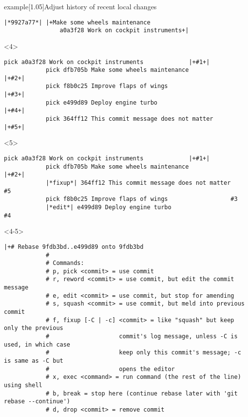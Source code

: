 \documentclass[usenames,svgnames,14pt]{beamer}
\begin{document}
\begin{frame}[c,fragile]
\begin{varblock}{example}[1.05\textwidth]{Adjust history of recent local changes}
\begin{uncoverenv}
\begin{lstlisting}[style=MyBash, aboveskip=-4pt]
                |*9927a77*| |+Make some wheels maintenance
                a0a3f28 Work on cockpit instruments+|
            \end{lstlisting}
        \end{uncoverenv}
    \end{varblock}
    \begin{onlyenv}<4>
        \begin{lstlisting}[style=MyBash]
            pick a0a3f28 Work on cockpit instruments             |+#1+|
            pick dfb705b Make some wheels maintenance            |+#2+|
            pick f8b0c25 Improve flaps of wings                  |+#3+|
            pick e499d89 Deploy engine turbo                     |+#4+|
            pick 364ff12 This commit message does not matter     |+#5+|
        \end{lstlisting}
    \end{onlyenv}
    \begin{onlyenv}<5>
        \begin{lstlisting}[style=MyBash]
            pick a0a3f28 Work on cockpit instruments             |+#1+|
            pick dfb705b Make some wheels maintenance            |+#2+|
            |*fixup*| 364ff12 This commit message does not matter    #5
            pick f8b0c25 Improve flaps of wings                  #3
            |*edit*| e499d89 Deploy engine turbo                     #4
        \end{lstlisting}
    \end{onlyenv}
    \begin{onlyenv}<4-5>
        \begin{lstlisting}[style=MyBash, basicstyle=\ttfamily\tiny\color{basic-color}, aboveskip=-4pt]
            |+# Rebase 9fdb3bd..e499d89 onto 9fdb3bd
            #
            # Commands:
            # p, pick <commit> = use commit
            # r, reword <commit> = use commit, but edit the commit message
            # e, edit <commit> = use commit, but stop for amending
            # s, squash <commit> = use commit, but meld into previous commit
            # f, fixup [-C | -c] <commit> = like "squash" but keep only the previous
            #                    commit's log message, unless -C is used, in which case
            #                    keep only this commit's message; -c is same as -C but
            #                    opens the editor
            # x, exec <command> = run command (the rest of the line) using shell
            # b, break = stop here (continue rebase later with 'git rebase --continue')
            # d, drop <commit> = remove commit

\end{lstlisting}
\end{onlyenv}
\end{frame}
\end{document}
